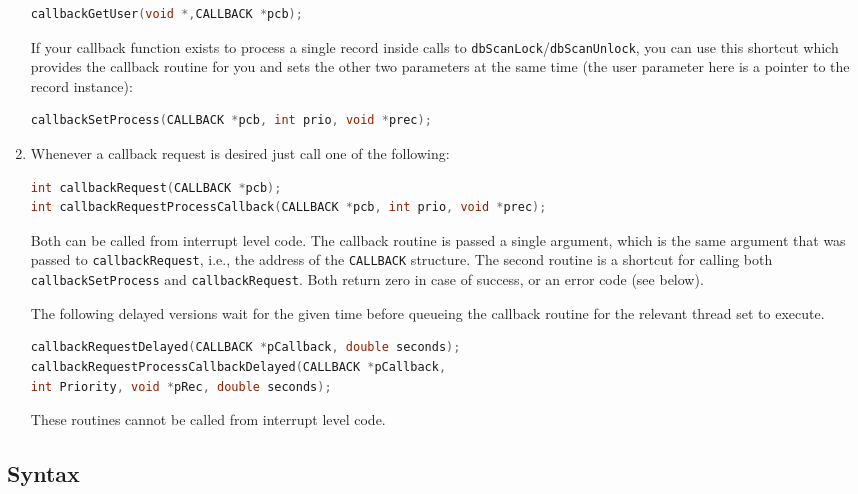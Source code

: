 \begin{enumerate}
\begin{lstlisting}[language=C]
callbackGetUser(void *,CALLBACK *pcb);
\end{lstlisting}

If your callback function exists to process a single record inside calls to \verb|dbScanLock|/\verb|dbScanUnlock|, you can use this shortcut which provides the callback routine for you and sets the other two parameters at the same time 
(the user parameter here is a pointer to the record instance):

\begin{lstlisting}[language=C]
callbackSetProcess(CALLBACK *pcb, int prio, void *prec);
\end{lstlisting}

\item Whenever a callback request is desired just call one of the following:

\begin{lstlisting}[language=C]
int callbackRequest(CALLBACK *pcb);
int callbackRequestProcessCallback(CALLBACK *pcb, int prio, void *prec);
\end{lstlisting}

Both can be called from interrupt level code. The callback routine is passed a single argument, which is the same argument that was passed to \verb|callbackRequest|, i.e., the address of the \verb|CALLBACK| structure. The second routine is a shortcut for calling both \verb|callbackSetProcess| and \verb|callbackRequest|. Both return zero in case of success, or an error code (see below). 

The following delayed versions wait for the given time before queueing the callback routine for the relevant thread set to execute.

\begin{lstlisting}[language=C]
callbackRequestDelayed(CALLBACK *pCallback, double seconds);
callbackRequestProcessCallbackDelayed(CALLBACK *pCallback,
int Priority, void *pRec, double seconds);
\end{lstlisting}

These routines cannot be called from interrupt level code.
\end{enumerate}

\subsection{Syntax}

